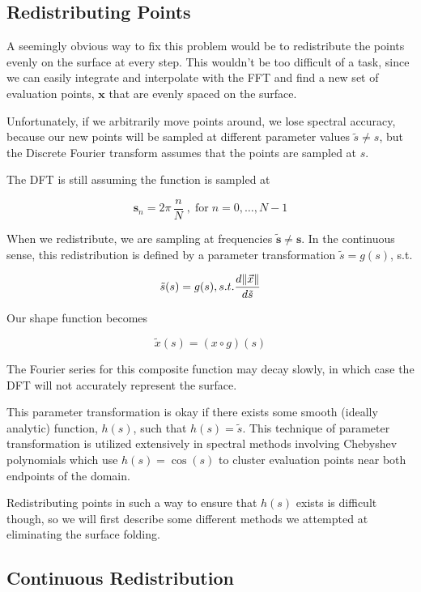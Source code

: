 \subsection*{Redistributing Points}

A seemingly obvious way to fix this problem would be to redistribute the points evenly on the surface at every step. This wouldn't be too difficult of a task, since we can easily integrate and interpolate with the FFT and find a new set of evaluation points, $\boldsymbol{x}$ that are evenly spaced on the surface. 

Unfortunately, if we arbitrarily move points around, we lose spectral accuracy, because our new points will be sampled at different parameter values $\tilde{s} \ne s$, but the Discrete Fourier transform assumes that the points are sampled at $s$. 


The DFT is still assuming the function is sampled at

\[ \boldsymbol{s}_n = 2 \pi \, \frac{n}{N} \; , \; \text{for} \; n = 0, \dotsc, N-1 \]  

When we redistribute, we are sampling at frequencies $\boldsymbol{\tilde{s}} \ne \boldsymbol{s}$. In the continuous sense, this redistribution is defined by a parameter transformation $\tilde{s} = g(s)$, s.t.

\[ \tilde{s}(s) = g(s), s.t. \frac{d \norm{\vec{x}}}{d\tilde{s}} \]

Our shape function becomes

\[ \tilde{x}(s) = (x \circ g)(s) \]

The Fourier series for this composite function may decay slowly, in which case the DFT will not accurately represent the surface.

This parameter transformation is okay if there exists some smooth (ideally analytic) function, $h(s)$, such that $h(s) = \tilde{s}$. This technique of parameter transformation is utilized extensively in spectral methods involving Chebyshev polynomials which use $h(s) = \cos(s)$ to cluster evaluation points near both endpoints of the domain.

Redistributing points in such a way to ensure that $h(s)$ exists is difficult though, so we will first describe some different methods we attempted at eliminating the surface folding.

\subsection*{Continuous Redistribution}

